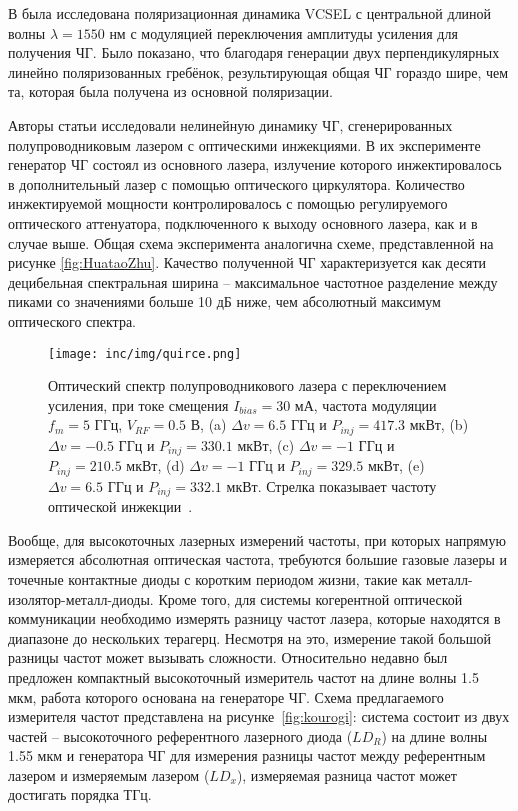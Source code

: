 В \cite{Quirce2018} была исследована поляризационная динамика VCSEL с центральной длиной волны $\lambda=1550$ нм с модуляцией переключения амплитуды усиления для получения ЧГ. Было показано, что благодаря генерации двух перпендикулярных линейно поляризованных гребёнок, результирующая общая ЧГ гораздо шире, чем та, которая была получена из основной поляризации. 

Авторы статьи \cite{Quirce2020} исследовали нелинейную динамику ЧГ, сгенерированных полупроводниковым лазером с оптическими инжекциями. В их эксперименте генератор ЧГ состоял из основного лазера, излучение которого инжектировалось в дополнительный лазер с помощью оптического циркулятора. Количество инжектируемой мощности контролировалось с помощью регулируемого оптического аттенуатора, подключенного к выходу основного лазера, как и в случае выше. Общая схема эксперимента аналогична схеме, представленной на рисунке \ref{fig:HuataoZhu}. Качество полученной ЧГ характеризуется как десяти децибельная спектральная ширина \--- максимальное частотное разделение между пиками со значениями больше 10 дБ ниже, чем абсолютный максимум оптического спектра. 

\begin{figure}[ht]
  \centering
  \texttt{[image: inc/img/quirce.png]}
  \caption{Оптический спектр полупроводникового лазера с переключением усиления, при токе смещения $I_{bias} = 30$ мА, частота модуляции $f_m = 5$ ГГц, $V_{RF}=0.5$ В, (a) $\Delta v = 6.5$ ГГц и $P_{inj}=417.3$ мкВт, (b) $\Delta v = -0.5$ ГГц и $P_{inj}=330.1$ мкВт, (c) $\Delta v = -1$ ГГц и $P_{inj}=210.5$ мкВт, (d) $\Delta v = -1$ ГГц и $P_{inj}=329.5$ мкВт, (e) $\Delta v = 6.5$ ГГц и $P_{inj}=332.1$ мкВт. Стрелка показывает частоту оптической инжекции~\cite{Quirce2020}.}
  \label{fig:quirce}
\end{figure}

Вообще, для высокоточных лазерных измерений частоты, при которых напрямую измеряется абсолютная оптическая частота, требуются большие газовые лазеры и точечные контактные диоды с коротким периодом жизни, такие как металл-изолятор-металл\--диоды. Кроме того, для системы когерентной оптической коммуникации необходимо измерять разницу частот лазера, которые находятся в диапазоне до нескольких терагерц. Несмотря на это, измерение такой большой разницы частот может вызывать сложности. Относительно недавно был предложен \cite{Kourogi1993} компактный высокоточный измеритель частот на длине волны 1.5 мкм, работа которого основана на генераторе ЧГ. Схема предлагаемого измерителя частот представлена на рисунке~\ref{fig:kourogi}: система состоит из двух частей \--- высокоточного референтного лазерного диода ($LD_R$) на длине волны 1.55 мкм и генератора ЧГ для измерения разницы частот между референтным лазером и измеряемым лазером ($LD_x$), измеряемая разница частот может достигать порядка ТГц.

